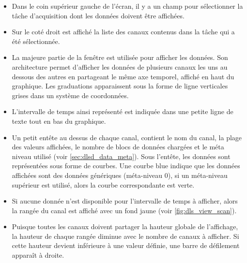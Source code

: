 \documentclass[a4paper,12pt,BCOR6mm,bibtotoc,idxtotoc]{scrbook}
\begin{document}
\begin{itemize}

\item Dans le coin sup\'erieur gauche de l'\'ecran, il y a un champ
  pour s\'electionner la t\^ache d'acquisition dont les donn\'ees doivent
  \^etre affich\'ees.

\item Sur le cot\'e droit est affich\'e la liste des canaux contenus
  dans la t\^ache qui a \'et\'e s\'electionn\'ee.

\item La majeure partie de la fen\^etre est utilis\'ee pour afficher
  les donn\'ees.  Son architecture permet d'afficher les donn\'ees de
  plusieurs canaux les uns au dessous des autres en partageant le
  m\^eme axe temporel, affich\'e en haut du graphique. Les graduations
  apparaissent sous la forme de ligne verticales grises dans un
  syst\`eme de coordonn\'ees.

\item L'intervalle de temps ainsi repr\'esent\'e est indiqu\'ee
  dans une petite ligne de texte tout en bas du graphique.

\item Un petit ent\^ete au dessus de chaque canal, contient le nom du
  canal, la plage des valeurs affich\'ees, le nombre de blocs de
  donn\'ees charg\'ees et le m\'eta niveau utilis\'e (voir
  \autoref{sec:dlsd_data_meta}).  Sous l'ent\^ete, les donn\'ees sont
  repr\'esent\'ees sous forme de courbes.  Une courbe blue indique que
  les donn\'ees affich\'ees sont des donn\'ees g\'en\'eriques
  (m\'eta-niveau 0), si un m\'eta-niveau sup\'erieur est utilis\'e,
  alors la courbe correspondante est verte.

\item Si aucune donn\'ee n'est disponible pour l'intervalle de temps
  \`a afficher, alors la rang\'ee du canal est affich\'e avec un fond
  jaune (voir \autoref{fig:dls_view_scan}).

\item Puisque toutes les canaux doivent partager la hauteur globale de
  l'affichage, la hauteur de chaque rang\'ee diminue avec le nombre
  de canaux \`a afficher. Si cette hauteur devient inf\'erieure \`a une
  valeur d\'efinie, une barre de d\'efilement appara\^it \`a droite.

\end{itemize}

\end{document}
